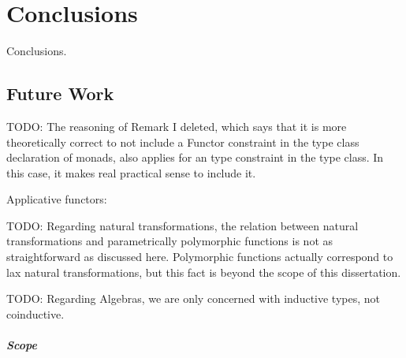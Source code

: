 \chapter{Conclusions}
\label{chap:conclusions}

\begin{epigraphs}
\end{epigraphs}

Conclusions.





\section{Future Work}

TODO: The reasoning of Remark I deleted, which says that it is more
theoretically correct to not include a Functor constraint in the type
class declaration of monads, also applies for an
 type constraint in the 
type class. In this case, it makes real practical sense to include
it.

Applicative functors: \parencite{mcbride-paterson-2008}

TODO: Regarding natural transformations, the relation between natural
transformations and parametrically polymorphic functions is not as
straightforward as discussed here. Polymorphic functions actually
correspond to lax natural transformations, but this fact is beyond the
scope of this dissertation.

TODO: Regarding Algebras, we are only concerned with inductive types,
not coinductive.

\paragraph{Scope}

